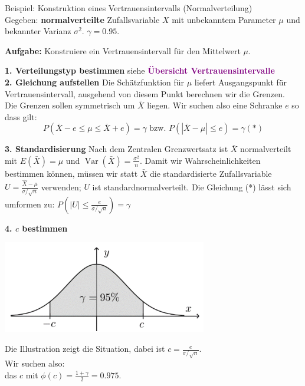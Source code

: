 \begin{example2}{Beispiel: Konstruktion eines Vertrauensintervalls (Normalverteilung)}\\
Gegeben: \textbf{normalverteilte} Zufallsvariable $X$ mit unbekanntem Parameter $\mu$ und bekannter Varianz $\sigma^2$. $\gamma = 0.95$. 

\textbf{Aufgabe:} Konstruiere ein Vertrauensintervall für den Mittelwert $\mu$.

\textbf{1. Verteilungstyp bestimmen}
siehe \textcolor{purple}{\textbf{Übersicht Vertrauensintervalle}}
\vspace{2mm}\\
\textbf{2. Gleichung aufstellen}
Die Schätzfunktion für $\mu$ liefert Ausgangspunkt für Vertrauensintervall, ausgehend von diesem Punkt berechnen wir die Grenzen.
\vspace{1mm}\\
Die Grenzen sollen symmetrisch um $\bar{X}$ liegen. Wir suchen also eine Schranke $e$ so dass gilt:
$$
P(\bar{X}-e \leq \mu \leq \bar{X}+e)=\gamma \text{ bzw. } P(|\bar{X}-\mu| \leq e)=\gamma(*)
$$

\textbf{3. Standardisierung}
Nach dem Zentralen Grenzwertsatz ist $\bar{X}$ normalverteilt mit $E(\bar{X})=\mu$ und $\operatorname{Var}(\bar{X})=\frac{\sigma^2}{n}$. Damit wir Wahrscheinlichkeiten bestimmen können, müssen wir statt $\bar{X}$ die standardisierte Zufallsvariable $U=\frac{\hat{X}-\mu}{\sigma / \sqrt{n}}$ verwenden; $U$ ist standardnormalverteilt.
Die Gleichung (*) lässt sich umformen zu:
$
P(|U| \leq \frac{e}{\sigma / \sqrt{n}})=\gamma
$

\textbf{4. $c$ bestimmen}

\begin{minipage}{0.5\linewidth}
\includegraphics[width=\linewidth]{images/bsp_vertrauensintervall.png}
\end{minipage}
\begin{minipage}{0.5\linewidth}
Die Illustration zeigt die Situation, dabei ist $c=\frac{e}{\sigma / \sqrt{n}}$.
\vspace{1mm}\\
Wir suchen also: \\das $c$ mit $\phi(c)=\frac{1+\gamma}{2}=0.975$.
\end{minipage}


\end{example2}
